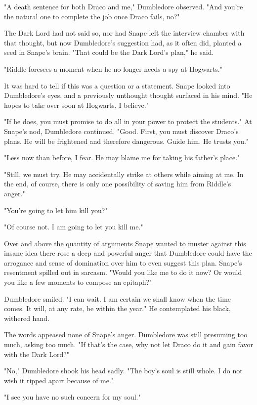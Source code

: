 \documentclass[a4paper,11pt]{article}
\begin{document}
"A death sentence for both Draco and me," Dumbledore observed. "And you're the natural one to complete the job once Draco fails, no?"

The Dark Lord had not said so, nor had Snape left the interview chamber with that thought, but now Dumbledore's suggestion had, as it often did, planted a seed in Snape's brain. "That could be the Dark Lord's plan," he said.

"Riddle foresees a moment when he no longer needs a spy at Hogwarts."

It was hard to tell if this was a question or a statement. Snape looked into Dumbledore's eyes, and a previously unthought thought surfaced in his mind. "He hopes to take over soon at Hogwarts, I believe."

"If he does, you must promise to do all in your power to protect the students." At Snape's nod, Dumbledore continued. "Good. First, you must discover Draco's plans. He will be frightened and therefore dangerous. Guide him. He trusts you."

"Less now than before, I fear. He may blame me for taking his father's place."

"Still, we must try. He may accidentally strike at others while aiming at me. In the end, of course, there is only one possibility of saving him from Riddle's anger."

"You're going to let him kill you?"

"Of course not. I am going to let you kill me."

Over and above the quantity of arguments Snape wanted to muster against this insane idea there rose a deep and powerful anger that Dumbledore could have the arrogance and sense of domination over him to even suggest this plan. Snape's resentment spilled out in sarcasm. "Would you like me to do it now? Or would you like a few moments to compose an epitaph?"

Dumbledore smiled. "I can wait. I am certain we shall know when the time comes. It will, at any rate, be within the year." He contemplated his black, withered hand.

The words appeased none of Snape's anger. Dumbledore was still presuming too much, asking too much. "If that's the case, why not let Draco do it and gain favor with the Dark Lord?"

"No," Dumbledore shook his head sadly. "The boy's soul is still whole. I do not wish it ripped apart because of me."

"I see you have no such concern for my soul."
\end{document}
